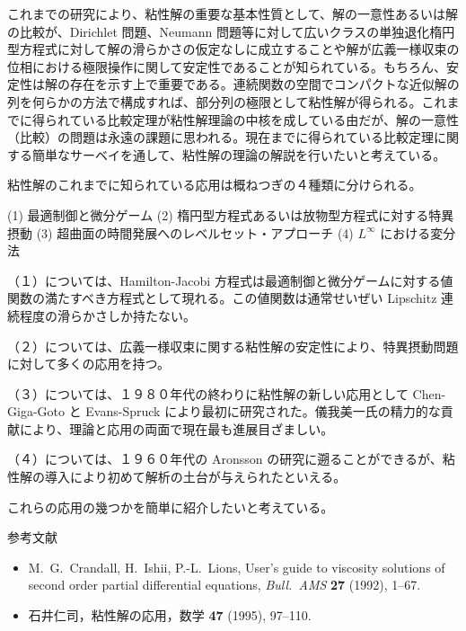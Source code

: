 \documentclass[uplatex,dvipdfmx]{jlreq}
\begin{document}
これまでの研究により、粘性解の重要な基本性質として、解の一意性あるいは解の比較が、Dirichlet 問題、Neumann 問題等に対して広いクラスの単独退化楕円型方程式に対して解の滑らかさの仮定なしに成立することや解が広義一様収束の位相における極限操作に関して安定性であることが知られている。もちろん、安定性は解の存在を示す上で重要である。連続関数の空間でコンパクトな近似解の列を何らかの方法で構成すれば、部分列の極限として粘性解が得られる。これまでに得られている比較定理が粘性解理論の中核を成している由だが、解の一意性（比較）の問題は永遠の課題に思われる。現在までに得られている比較定理に関する簡単なサーベイを通して、粘性解の理論の解説を行いたいと考えている。

粘性解のこれまでに知られている応用は概ねつぎの４種類に分けられる。

(1) 最適制御と微分ゲーム  
(2) 楕円型方程式あるいは放物型方程式に対する特異摂動  
(3) 超曲面の時間発展へのレベルセット・アプローチ  
(4) $L^\infty$ における変分法  

（１）については、Hamilton-Jacobi 方程式は最適制御と微分ゲームに対する値関数の満たすべき方程式として現れる。この値関数は通常せいぜい Lipschitz 連続程度の滑らかさしか持たない。

（２）については、広義一様収束に関する粘性解の安定性により、特異摂動問題に対して多くの応用を持つ。

（３）については、１９８０年代の終わりに粘性解の新しい応用として Chen-Giga-Goto と Evans-Spruck により最初に研究された。儀我美一氏の精力的な貢献により、理論と応用の両面で現在最も進展目ざましい。

（４）については、１９６０年代の Aronsson の研究に遡ることができるが、粘性解の導入により初めて解析の土台が与えられたといえる。

これらの応用の幾つかを簡単に紹介したいと考えている。

\bigskip

\begin{center}
  {\large 参考文献}
\end{center}

\begin{itemize}
  \setlength{\itemsep}{3pt}
  \item[{[1]}] M.~G.~Crandall, H.~Ishii, P.-L.~Lions,
        User's guide to viscosity solutions of second order partial differential equations,
        \textit{Bull.\ AMS} \textbf{27} (1992), 1--67.
  \item[{[2]}] 石井仁司，粘性解の応用，数学 \textbf{47} (1995), 97--110.
\end{itemize}
\end{document}
